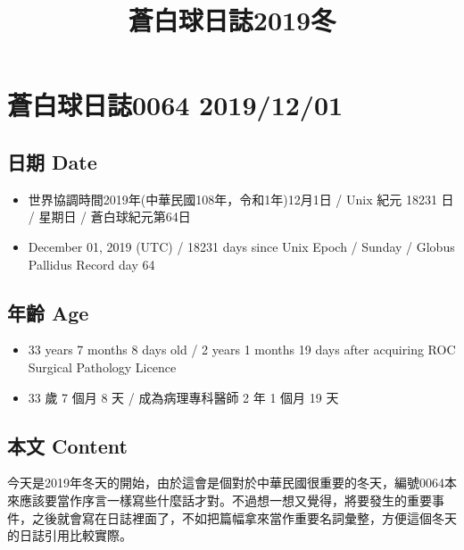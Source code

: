 \documentclass[a5paper, 12pt
]{book}
\date{}
\title{蒼白球日誌2019冬}
\providecommand{\tightlist}{%
  \setlength{\itemsep}{0pt}\setlength{\parskip}{0pt}}
\begin{document}
\maketitle
\newpage\null\thispagestyle{empty}\newpage
\frontmatter
\tableofcontents

\mainmatter

\hypertarget{ux84bcux767dux7403ux65e5ux8a8c0064-20191201}{%
\section{蒼白球日誌0064
2019/12/01}\label{ux84bcux767dux7403ux65e5ux8a8c0064-20191201}}

\hypertarget{ux65e5ux671f-date}{%
\subsection{日期 Date}\label{ux65e5ux671f-date}}

\begin{itemize}
\tightlist
\item
  世界協調時間2019年(中華民國108年，令和1年)12月1日 / Unix 紀元 18231 日
  / 星期日 / 蒼白球紀元第64日
\item
  December 01, 2019 (UTC) / 18231 days since Unix Epoch / Sunday /
  Globus Pallidus Record day 64
\end{itemize}

\hypertarget{ux5e74ux9f61-age}{%
\subsection{年齡 Age}\label{ux5e74ux9f61-age}}

\begin{itemize}
\tightlist
\item
  33 years 7 months 8 days old / 2 years 1 months 19 days after
  acquiring ROC Surgical Pathology Licence
\item
  33 歲 7 個月 8 天 / 成為病理專科醫師 2 年 1 個月 19 天
\end{itemize}

\hypertarget{ux672cux6587-content}{%
\subsection{本文 Content}\label{ux672cux6587-content}}

今天是2019年冬天的開始，由於這會是個對於中華民國很重要的冬天，編號0064本來應該要當作序言一樣寫些什麼話才對。不過想一想又覺得，將要發生的重要事件，之後就會寫在日誌裡面了，不如把篇幅拿來當作重要名詞彙整，方便這個冬天的日誌引用比較實際。
\end{document}
